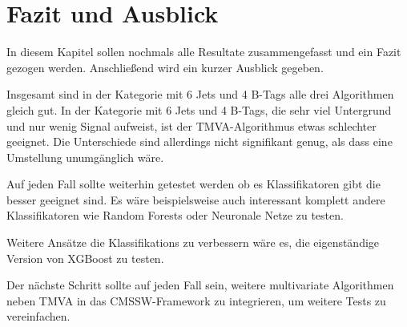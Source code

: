
\chapter{Fazit und Ausblick}
\label{ch:Fazit}

{}

In diesem Kapitel sollen nochmals alle Resultate zusammengefasst und ein Fazit gezogen werden. Anschließend wird ein kurzer Ausblick gegeben.

Insgesamt sind in der Kategorie mit 6 Jets und 4 B-Tags alle drei Algorithmen gleich gut. In der Kategorie mit 6 Jets und 4 B-Tags, die sehr viel Untergrund und nur wenig Signal aufweist, ist der TMVA-Algorithmus etwas schlechter geeignet. Die Unterschiede sind allerdings nicht signifikant genug, als dass eine Umstellung unumgänglich wäre.

Auf jeden Fall sollte weiterhin getestet werden ob es Klassifikatoren gibt die besser geeignet sind. Es wäre beispielsweise auch interessant komplett andere Klassifikatoren wie Random Forests oder Neuronale Netze zu testen.

Weitere Ansätze die Klassifikations zu verbessern wäre es, die eigenständige Version von XGBoost zu testen.

Der nächste Schritt sollte auf jeden Fall sein, weitere multivariate Algorithmen neben TMVA in das CMSSW-Framework zu integrieren, um weitere Tests zu vereinfachen.